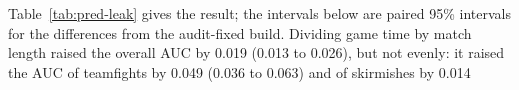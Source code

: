 Table~\ref{tab:pred-leak} gives the result; the intervals below are paired 95\% intervals for the differences
from the audit-fixed build. Dividing game time by match length raised the overall AUC by 0.019 (0.013 to
0.026), but not evenly: it raised the AUC of teamfights by 0.049 (0.036 to 0.063) and of skirmishes by 0.014
